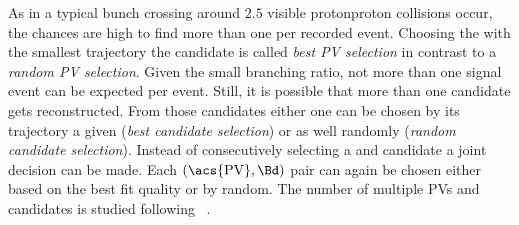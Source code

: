 As in a typical \LHCb bunch crossing around $\num{2.5}$ visible
\acl{protonproton} collisions occur, the chances are high to find more than one
\PV per recorded event. Choosing the \PV with the smallest \DTF trajectory \IP
\chisqndf \wrt the \Bd candidate is called \emph{best PV selection} in contrast
to a \emph{random PV selection}. Given the small \BdToJpsiKS branching ratio,
not more than one signal event can be expected per event. Still, it is possible
that more than one candidate gets reconstructed. From those candidates either
one can be chosen by its \DTF trajectory \IP \chisqndf \wrt a given \PV
(\emph{best \Bd candidate selection}) or as well randomly (\emph{random \Bd
candidate selection}). Instead of consecutively selecting a \PV and \Bmeson
candidate a joint decision can be made. Each $(\text{\acs{PV}}, \Bd)$ pair can
again be chosen either based on the best fit quality or by random. The number of
multiple \acp{PV} and candidates is studied following \Ref~\cite{Koppenburg:1340942}.

